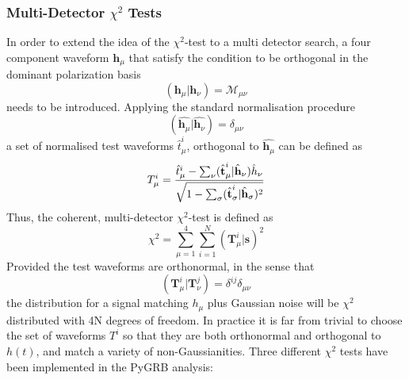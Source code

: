 \documentclass[binding=0.6cm, LaM]{sapthesis}
\begin{document}
\subsubsection{Multi-Detector $\chi^2$ Tests}
\label{subsubsec:multidec_chi_test}	
	In order to extend the idea of the $\chi^2$-test to a multi detector search,
	a four component waveform $\textbf{h}_{\mu}$ that satisfy the condition to 	
	be orthogonal in the dominant polarization basis 
		\begin{equation}
			(\textbf{h}_{\mu}|\textbf{h}_{\nu}) = \mathcal{M}_{\mu \nu}
		\end{equation}
	needs to be introduced.
	Applying the standard normalisation procedure
		\begin{equation}
			(\hat{\textbf{h}_{\mu}}|\hat{\textbf{h}_{\nu}}) = \delta_{\mu \nu}
		\end{equation}
	a set of normalised test waveforms $\hat{t}^i_{\mu}$, orthogonal to $\hat{\textbf{h}_{\mu}}$ can be defined as
		\begin{equation}
			T^i_{\mu} = {{\hat{t}^i_{\mu} - \sum_{\nu}(\hat{\textbf{t}}^i_{\mu}|\hat{\textbf{h}}_{\nu})\hat{h}_{\nu}} \over {\sqrt{1-\sum_{\sigma}(\hat{\textbf{t}}^i_{\sigma}|\hat{\textbf{h}}_{\sigma})^2}}}
		\end{equation}
	Thus, the coherent, multi-detector $\chi^2$-test is defined as 
		\begin{equation}
			\chi^2= \sum^4_{\mu=1} \sum^N_{i=1} (\textbf{T}^i_{\mu}|\textbf{s})^2
		\end{equation}
	Provided the test waveforms are orthonormal, in the 
sense that 
		\begin{equation}
			 (\textbf{T}^i_{\mu}| \textbf{T}^j_{\nu})= \delta^{ij} \delta_{\mu \nu}
		\end{equation}
	the distribution for a signal matching $h_{\mu}$ plus Gaussian noise will be $\chi^2$ distributed with 4N degrees of freedom. 
	In practice it is far from trivial to choose the set of waveforms $T^i$ so that 
	they are both orthonormal and orthogonal to $h(t)$, and match a variety of non-Gaussianities. 
	Three different $\chi^2$ tests have been implemented in the {\ttfamily PyGRB} analysis: 
\end{document}
